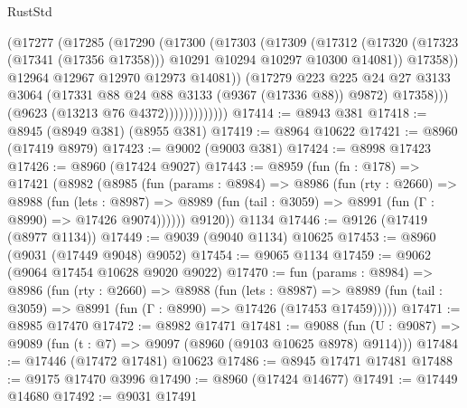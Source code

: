 \begin{lexlean}{RustStd}
\begin{coremodule}
                          (@17277
                            (@17285
                              (@17290
                                (@17300
                                  (@17303
                                    (@17309
                                      (@17312
                                        (@17320
                                          (@17323 (@17341 (@17356 @17358)))
                                          @10291
                                          @10294
                                          @10297
                                          @10300
                                          @14081))
                                      @17358))
                                  @12964
                                  @12967
                                  @12970
                                  @12973
                                  @14081))
                              (@17279
                                @223
                                @225
                                @24
                                @27
                                @3133
                                @3064
                                (@17331 @88 @24 @88 @3133 (@9367 (@17336 @88)) @9872)
                                @17358)))
                          (@9623 (@13213 @76 @4372)))))))))))))
@17414 := @8943 @381
@17418 := @8945 (@8949 @381) (@8955 @381)
@17419 := @8964 @10622
@17421 := @8960 (@17419 @8979)
@17423 := @9002 (@9003 @381)
@17424 := @8998 @17423
@17426 := @8960 (@17424 @9027)
@17443 := @8959
    (fun (fn : @178) =>
    @17421
      (@8982
        (@8985
          (fun (params : @8984) =>
          @8986
            (fun (rty : @2660) =>
            @8988
              (fun (lets : @8987) =>
              @8989 (fun (tail : @3059) => @8991 (fun (Γ : @8990) => @17426 @9074))))))
        @9120))
    @1134
@17446 := @9126 (@17419 (@8977 @1134))
@17449 := @9039 (@9040 @1134) @10625
@17453 := @8960 (@9031 (@17449 @9048) @9052)
@17454 := @9065 @1134
@17459 := @9062 (@9064 @17454 @10628 @9020 @9022)
@17470 := fun (params : @8984) =>
  @8986
    (fun (rty : @2660) =>
    @8988
      (fun (lets : @8987) =>
      @8989 (fun (tail : @3059) => @8991 (fun (Γ : @8990) => @17426 (@17453 @17459)))))
@17471 := @8985 @17470
@17472 := @8982 @17471
@17481 := @9088
    (fun (U : @9087) => @9089 (fun (t : @7) => @9097 (@8960 (@9103 @10625 @8978) @9114)))
@17484 := @17446 (@17472 @17481) @10623
@17486 := @8945 @17471 @17481
@17488 := @9175 @17470 @3996
@17490 := @8960 (@17424 @14677)
@17491 := @17449 @14680
@17492 := @9031 @17491

\end{coremodule}
\end{lexlean}
